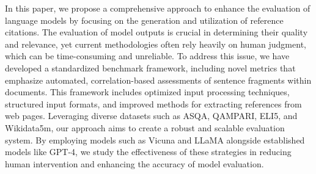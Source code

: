 In this paper, we propose a comprehensive approach to enhance the evaluation of language models by focusing on the generation and utilization of reference citations. The evaluation of model outputs is crucial in determining their quality and relevance, yet current methodologies often rely heavily on human judgment, which can be time-consuming and unreliable. To address this issue, we have developed a standardized benchmark framework, including novel metrics that emphasize automated, correlation-based assessments of sentence fragments within documents. This framework includes optimized input processing techniques, structured input formats, and improved methods for extracting references from web pages. Leveraging diverse datasets such as ASQA, QAMPARI, ELI5, and Wikidata5m, our approach aims to create a robust and scalable evaluation system. By employing models such as Vicuna and LLaMA alongside established models like GPT-4, we study the effectiveness of these strategies in reducing human intervention and enhancing the accuracy of model evaluation.